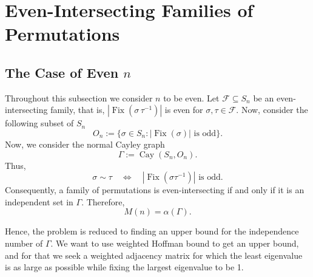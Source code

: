 \documentclass[12pt]{article}
\theoremstyle{definition}
\newcommand{\1}{\mathbf 1}
\newcommand{\Fix}{\operatorname{Fix}}
\begin{document}
\section{Even-Intersecting Families of Permutations}
\label{sec:Even_intersecting_family}
\subsection{The Case of Even  \texorpdfstring{$n$}{n}}
\label{subsec:Even_intersecting_family_even_n}

Throughout this subsection we consider $n$ to be even. Let
$\mathcal{F}\subseteq S_n$ be an even-intersecting family, that is, $|\Fix(\sigma \,\tau^{-1})|$ is even for  $\sigma,\tau\in \mathcal{F}$. Now, consider the following subset of $S_n$
$$
O_n
:=
\{\sigma\in S_n: |\Fix(\sigma)|\text{ is odd}\}.
$$
 Now, we consider the normal Cayley graph
$$
\Gamma:=\operatorname{Cay}(S_n,O_n).
$$ Thus,
$$
\sigma\sim\tau
\quad\Longleftrightarrow\quad
|\Fix(\sigma\tau^{-1})|\text{ is odd}.
$$
Consequently, a family of permutations is even-intersecting if and only if it
is an independent set in $\Gamma$. Therefore,
$$
M(n)=\alpha(\Gamma).
$$

Hence, the problem is reduced to finding an upper bound for the independence number of
$\Gamma$. We want to use weighted Hoffman bound to get an upper bound, and for that we seek a weighted adjacency
matrix for which the least eigenvalue is as large as possible while fixing the largest eigenvalue to be 1.
\end{document}
